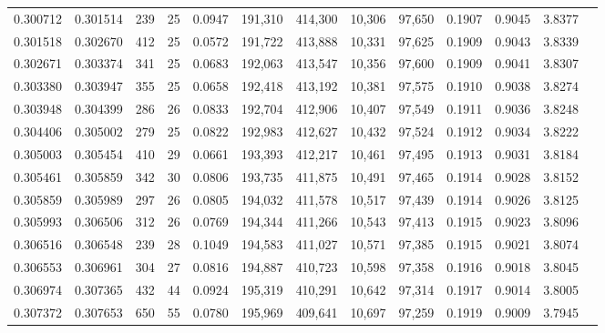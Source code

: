 \begin{tabular}{rrrrrrrrrrrrr}
0.300712 & 0.301514 &   239 &  25 &                                     0.0947 & 191,310 & 414,300 &  10,306 &  97,650 & 0.1907 & 0.9045 & 3.8377 \\
0.301518 & 0.302670 &   412 &  25 &                                     0.0572 & 191,722 & 413,888 &  10,331 &  97,625 & 0.1909 & 0.9043 & 3.8339 \\
0.302671 & 0.303374 &   341 &  25 &                                     0.0683 & 192,063 & 413,547 &  10,356 &  97,600 & 0.1909 & 0.9041 & 3.8307 \\
0.303380 & 0.303947 &   355 &  25 &                                     0.0658 & 192,418 & 413,192 &  10,381 &  97,575 & 0.1910 & 0.9038 & 3.8274 \\
0.303948 & 0.304399 &   286 &  26 &                                     0.0833 & 192,704 & 412,906 &  10,407 &  97,549 & 0.1911 & 0.9036 & 3.8248 \\
0.304406 & 0.305002 &   279 &  25 &                                     0.0822 & 192,983 & 412,627 &  10,432 &  97,524 & 0.1912 & 0.9034 & 3.8222 \\
0.305003 & 0.305454 &   410 &  29 &                                     0.0661 & 193,393 & 412,217 &  10,461 &  97,495 & 0.1913 & 0.9031 & 3.8184 \\
0.305461 & 0.305859 &   342 &  30 &                                     0.0806 & 193,735 & 411,875 &  10,491 &  97,465 & 0.1914 & 0.9028 & 3.8152 \\
0.305859 & 0.305989 &   297 &  26 &                                     0.0805 & 194,032 & 411,578 &  10,517 &  97,439 & 0.1914 & 0.9026 & 3.8125 \\
0.305993 & 0.306506 &   312 &  26 &                                     0.0769 & 194,344 & 411,266 &  10,543 &  97,413 & 0.1915 & 0.9023 & 3.8096 \\
0.306516 & 0.306548 &   239 &  28 &                                     0.1049 & 194,583 & 411,027 &  10,571 &  97,385 & 0.1915 & 0.9021 & 3.8074 \\
0.306553 & 0.306961 &   304 &  27 &                                     0.0816 & 194,887 & 410,723 &  10,598 &  97,358 & 0.1916 & 0.9018 & 3.8045 \\
0.306974 & 0.307365 &   432 &  44 &                                     0.0924 & 195,319 & 410,291 &  10,642 &  97,314 & 0.1917 & 0.9014 & 3.8005 \\
0.307372 & 0.307653 &   650 &  55 &                                     0.0780 & 195,969 & 409,641 &  10,697 &  97,259 & 0.1919 & 0.9009 & 3.7945 \\

\end{tabular}
